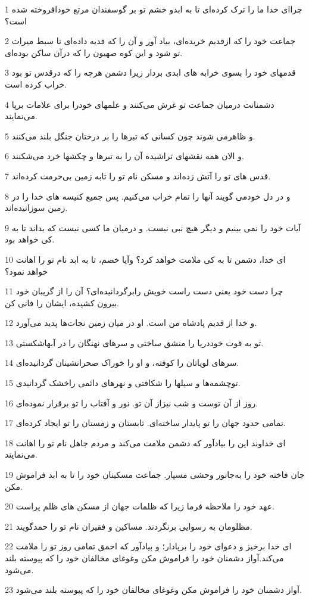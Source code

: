 \par 1 چرا‌ای خدا ما را ترک کرده‌ای تا به ابدو خشم تو بر گوسفندان مرتع خودافروخته شده است؟
\par 2 جماعت خود را که ازقدیم خریده‌ای، بیاد آور و آن را که فدیه داده‌ای تا سبط میراث تو شود و این کوه صهیون را که درآن ساکن بوده‌ای.
\par 3 قدمهای خود را بسوی خرابه های ابدی بردار زیرا دشمن هرچه را که درقدس تو بود خراب کرده است.
\par 4 دشمنانت درمیان جماعت تو غرش می‌کنند و علمهای خودرا برای علامات برپا می‌نمایند.
\par 5 و ظاهرمی شوند چون کسانی که تبرها را بر درختان جنگل بلند می‌کنند.
\par 6 و الان همه نقشهای تراشیده آن را به تبرها و چکشها خرد می‌شکنند.
\par 7 قدس های تو را آتش زده‌اند و مسکن نام تو را تابه زمین بی‌حرمت کرده‌اند.
\par 8 و در دل خودمی گویند آنها را تمام خراب می‌کنیم. پس جمیع کنیسه های خدا را در زمین سوزانیده‌اند.
\par 9 آیات خود را نمی بینیم و دیگر هیچ نبی نیست. و درمیان ما کسی نیست که بداند تا به کی خواهد بود.
\par 10 ‌ای خدا، دشمن تا به کی ملامت خواهد کرد؟ وآیا خصم، تا به ابد نام تو را اهانت خواهد نمود؟
\par 11 چرا دست خود یعنی دست راست خویش رابرگردانیده‌ای؟ آن را از گریبان خود بیرون کشیده، ایشان را فانی کن.
\par 12 و خدا از قدیم پادشاه من است. او در میان زمین نجات‌ها پدید می‌آورد.
\par 13 تو به قوت خوددریا را منشق ساختی و سرهای نهنگان را در آبهاشکستی.
\par 14 سرهای لویاتان را کوفته، و او را خوراک صحرانشینان گردانیده‌ای.
\par 15 توچشمه‌ها و سیلها را شکافتی و نهرهای دائمی راخشک گردانیدی.
\par 16 روز از آن توست و شب نیزاز آن تو. نور و آفتاب را تو برقرار نموده‌ای.
\par 17 تمامی حدود جهان را تو پایدار ساخته‌ای. تابستان و زمستان را تو ایجاد کرده‌ای.
\par 18 ‌ای خداوند این را بیادآور که دشمن ملامت می‌کند و مردم جاهل نام تو را اهانت می‌نمایند.
\par 19 جان فاخته خود را به‌جانور وحشی مسپار. جماعت مسکینان خود را تا به ابد فراموش مکن.
\par 20 عهد خود را ملاحظه فرما زیرا که ظلمات جهان از مسکن های ظلم پراست.
\par 21 مظلومان به رسوایی برنگردند. مساکین و فقیران نام تو را حمدگویند.
\par 22 ‌ای خدا برخیز و دعوای خود را برپادار؛ و بیادآور که احمق تمامی روز تو را ملامت می‌کند.آواز دشمنان خود را فراموش مکن وغوغای مخالفان خود را که پیوسته بلند می‌شود.
\par 23 آواز دشمنان خود را فراموش مکن وغوغای مخالفان خود را که پیوسته بلند می‌شود.
 
